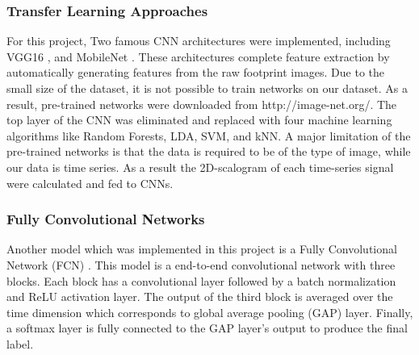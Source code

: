 \subsubsection{Transfer Learning Approaches}
For this project, Two famous CNN architectures were implemented, including VGG16 \cite{Simonyan2015VeryRecognition}, and MobileNet \cite{Howard2017MobileNets:Applications}. These architectures complete feature extraction by automatically generating features from the raw footprint images. 
Due to the small size of the dataset, it is not possible to train networks on our dataset. As a result, pre-trained networks were downloaded from http://image-net.org/. The top layer of the CNN was eliminated and replaced with four machine learning algorithms like Random Forests, LDA, SVM, and kNN. 
A major limitation of the pre-trained networks is that the data is required to be of the type of image, while our data is time series. As a result the 2D-scalogram of each time-series signal were calculated and fed to CNNs. 


\subsubsection{Fully Convolutional Networks}
Another model which was implemented in this project is a Fully Convolutional Network (FCN) \cite{WangTimeBaseline}. This model is a end-to-end convolutional network with three blocks. Each block has a convolutional layer followed by a batch normalization and ReLU activation layer. The output of the third block is averaged over the time dimension which corresponds to global average pooling (GAP) layer. Finally, a softmax layer is fully connected to the GAP layer’s output to produce the final label.


